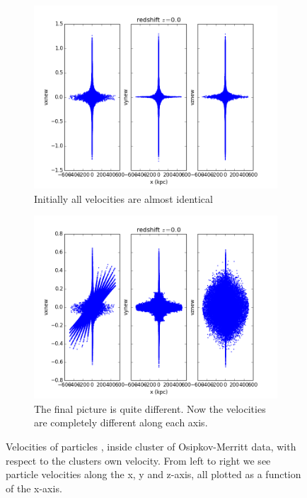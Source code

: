 \begin{figure}
\centering
\begin{subfigure}{.5\textwidth}
  \centering
  \includegraphics[width=1.0\linewidth]{img/Read_OMGOO_IC_5.png}
  \caption{Initially all velocities are almost identical}
  \label{fig:sub1}
\end{subfigure}%
\begin{subfigure}{.5\textwidth}
  \centering
  \includegraphics[width=1.0\linewidth]{img/Read_OMGOO_Final_5.png}
  \caption{The final picture is quite different. Now the velocities are completely different along each axis.}
  \label{fig:sub2}
\end{subfigure}
\caption{Velocities of particles , inside cluster of Osipkov-Merritt data, with respect to the clusters own velocity. From left to right we see particle velocities along the x, y and z-axis, all plotted as a function of the x-axis.}
\label{fig:test}
\end{figure}

